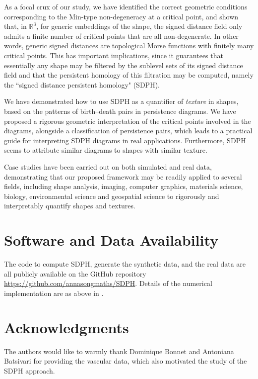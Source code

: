 \documentclass[11pt]{article}
\newcommand{\R}{\mathbb{R}}
\theoremstyle{plain}
\theoremstyle{definition}
\theoremstyle{remark}
\begin{document}
As a focal crux of our study, we have identified the correct geometric conditions corresponding to the Min-type non-degeneracy at a critical point,
and shown that, in $\R^3$, for generic embeddings of the shape, the signed distance field only admits a finite number of critical points that are all non-degenerate. In other words, generic signed distances are topological Morse functions with finitely many critical points.
This has important implications, since it guarantees that essentially any shape may be filtered by the sublevel sets of its signed distance field and that the persistent homology of this filtration may be computed, namely the ``signed distance persistent homology" (SDPH). 

We have demonstrated how to use SDPH as a quantifier of \textit{texture} in shapes, based on the patterns of birth--death pairs in persistence diagrams.
We have proposed a rigorous geometric interpretation of the critical points involved in the diagrams, alongside a classification of persistence pairs, which leads to a practical guide for interpreting SDPH diagrams in real applications. Furthermore, SDPH seems to attribute similar diagrams to shapes with similar texture.

Case studies have been carried out on both simulated and real data,
demonstrating that our proposed framework may be readily applied to several fields, including shape analysis, imaging, computer graphics, materials science, biology, environmental science and geospatial science to rigorously and interpretably quantify shapes and textures.

\section*{Software and Data Availability}

The code to compute SDPH, generate the synthetic data, and the real data are all publicly available on the GitHub repository \url{https://github.com/annasongmaths/SDPH}. Details of the numerical implementation are as above in .

\section*{Acknowledgments}

The authors would like to warmly thank Dominique Bonnet and Antoniana Batsivari for providing the vascular data, which also motivated the study of the SDPH approach.
\end{document}
